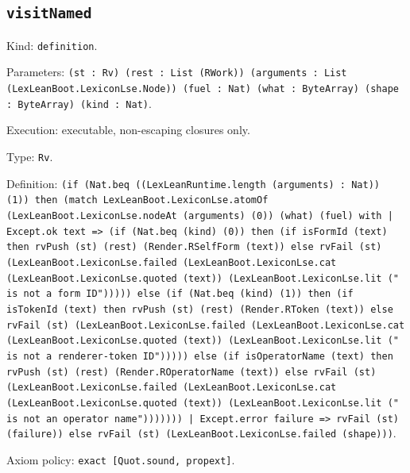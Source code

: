 \documentclass[11pt]{article}
\begin{document}
\subsection*{\texttt{visitNamed}}
\noindent Kind: \texttt{definition}.\par
\noindent Parameters: \texttt{(st : Rv) (rest : List (RWork)) (arguments : List (LexLeanBoot.LexiconLse.Node)) (fuel : Nat) (what : ByteArray) (shape : ByteArray) (kind : Nat)}.\par
\noindent Execution: executable, non-escaping closures only.\par
\noindent Type: \texttt{Rv}.\par
\noindent Definition: \texttt{(if (Nat.beq ((LexLeanRuntime.length (arguments) : Nat)) (1)) then (match LexLeanBoot.LexiconLse.atomOf (LexLeanBoot.LexiconLse.nodeAt (arguments) (0)) (what) (fuel) with | Except.ok text => (if (Nat.beq (kind) (0)) then (if isFormId (text) then rvPush (st) (rest) (Render.RSelfForm (text)) else rvFail (st) (LexLeanBoot.LexiconLse.failed (LexLeanBoot.LexiconLse.cat (LexLeanBoot.LexiconLse.quoted (text)) (LexLeanBoot.LexiconLse.lit (" is not a form ID"))))) else (if (Nat.beq (kind) (1)) then (if isTokenId (text) then rvPush (st) (rest) (Render.RToken (text)) else rvFail (st) (LexLeanBoot.LexiconLse.failed (LexLeanBoot.LexiconLse.cat (LexLeanBoot.LexiconLse.quoted (text)) (LexLeanBoot.LexiconLse.lit (" is not a renderer-token ID"))))) else (if isOperatorName (text) then rvPush (st) (rest) (Render.ROperatorName (text)) else rvFail (st) (LexLeanBoot.LexiconLse.failed (LexLeanBoot.LexiconLse.cat (LexLeanBoot.LexiconLse.quoted (text)) (LexLeanBoot.LexiconLse.lit (" is not an operator name"))))))) | Except.error failure => rvFail (st) (failure)) else rvFail (st) (LexLeanBoot.LexiconLse.failed (shape)))}.\par
\noindent Axiom policy: \texttt{exact [Quot.sound, propext]}.\par
\end{document}
